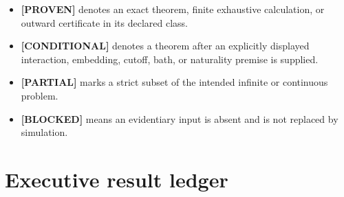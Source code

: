 \documentclass[11pt,a4paper]{article}
\newcommand{\Proven}{\textcolor{proved}{\textbf{[PROVEN]}}}
\newcommand{\Conditional}{\textcolor{conditional}{\textbf{[CONDITIONAL]}}}
\newcommand{\Partial}{\textcolor{conditional}{\textbf{[PARTIAL]}}}
\newcommand{\Blocked}{\textcolor{blocked}{\textbf{[BLOCKED]}}}
\begin{document}
\begin{itemize}
\item \Proven{} denotes an exact theorem, finite exhaustive calculation, or outward
certificate in its declared class.
\item \Conditional{} denotes a theorem after an explicitly displayed interaction,
embedding, cutoff, bath, or naturality premise is supplied.
\item \Partial{} marks a strict subset of the intended infinite or continuous problem.
\item \Blocked{} means an evidentiary input is absent and is not replaced by simulation.
\end{itemize}

\section{Executive result ledger}
\end{document}
